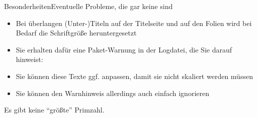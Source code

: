 \documentclass[
	aspectratio=169,	%
	onlytextwidth,		%
	t,					%
	]{beamer}
\begin{document}
	

	\begin{frame}{Besonderheiten}{Eventuelle Probleme, die gar keine sind}
		\begin{itemize}
			\item Bei überlangen (Unter-)Titeln auf der Titelseite und auf den Folien wird bei Bedarf die Schriftgröße heruntergesetzt
			\item Sie erhalten dafür eine Paket-Warnung in der Logdatei, die Sie darauf hinweist:
			\newline
			\item Sie können diese Texte ggf. anpassen, damit sie nicht skaliert werden müssen
			\item Sie können den Warnhinweis allerdings auch einfach ignorieren
		\end{itemize}

		\begin{theorem}
			Es gibt keine \enquote{größte} Primzahl.
		\end{theorem} 

	\end{frame}

	
	\appendix
	\makebibliography
	\makethankyou
\end{document}
